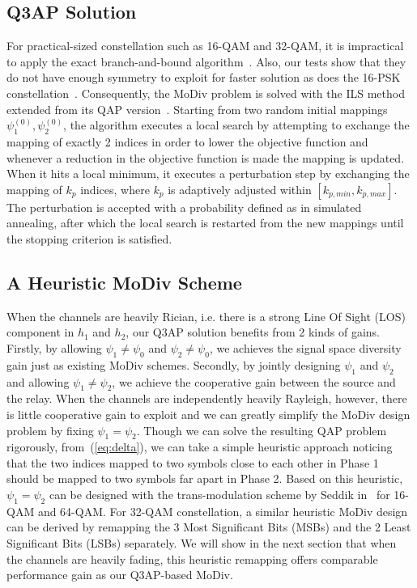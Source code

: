 \documentclass[journal]{IEEEtran}
\begin{document}
\subsection{Q3AP Solution}
For practical-sized constellation such as 16-QAM and 32-QAM, it is impractical
to apply the exact branch-and-bound algorithm~\cite{hahn2008quadratic}. Also,
our tests show that they do not have enough symmetry to exploit for faster
solution as does the 16-PSK constellation~\cite{mittelmann2015solving}.
Consequently, the MoDiv problem is solved with the ILS
method~\cite{hahn2008quadratic} extended from its QAP
version~\cite{stutzle2006iterated}. Starting from two random initial mappings
$\psi_1^{(0)}, \psi_2^{(0)}$, the algorithm executes a local search by
attempting to exchange the mapping of exactly 2 indices in order to lower the
objective function and whenever a reduction in the objective function is made
the mapping is updated. When it hits a local minimum, it executes a perturbation
step by exchanging the mapping of $k_p$ indices, where $k_p$ is adaptively
adjusted within $[k_{p,min}, k_{p,max}]$. The perturbation is accepted with a
probability defined as in simulated annealing, after which the local search is
restarted from the new mappings until the stopping criterion is satisfied.

\subsection{A Heuristic MoDiv Scheme}
\label{sec:heuristic}
When the channels are heavily Rician, i.e. there is a strong Line Of Sight (LOS)
component in $h_1$ and $h_2$,  our Q3AP solution benefits from 2 kinds of gains.
Firstly, by allowing $\psi_1\not=\psi_0$ and $\psi_2\not=\psi_0$, we achieves
the signal space diversity gain just as existing MoDiv schemes. Secondly, by
jointly designing $\psi_1$ and $\psi_2$ and allowing $\psi_1\not=\psi_2$, we
achieve the cooperative gain between the source and the relay. When the channels
are independently heavily Rayleigh, however, there is little cooperative gain to
exploit and we can greatly simplify the MoDiv design problem by fixing
$\psi_1=\psi_2$. Though we can solve the resulting QAP problem rigorously, 
from~(\ref{eq:delta}), we can take a simple heuristic approach noticing that the
two indices mapped to two symbols close to each other in Phase 1 should be
mapped to two symbols far apart in Phase 2. Based on this
heuristic, $\psi_1=\psi_2$ can be designed with the trans-modulation scheme by
Seddik in~\cite{seddik2008trans} for 16-QAM and 64-QAM. For 32-QAM
constellation, a similar heuristic MoDiv design can be derived by remapping the
3 Most Significant Bits (MSBs) and the 2 Least Significant Bits (LSBs)
separately. We will show in the next section that when the channels are heavily
fading, this heuristic remapping offers comparable performance gain as our
Q3AP-based MoDiv.
\end{document}
